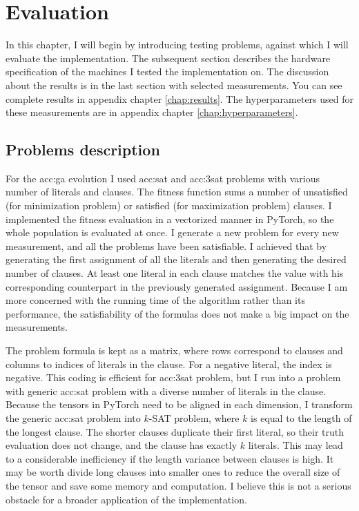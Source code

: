 \chapter{Evaluation}

In this chapter, I will begin by introducing testing problems, against which I will evaluate the implementation. The subsequent section describes the hardware specification of the machines I tested the implementation on. The discussion about the results is in the last section with selected measurements. You can see complete results in appendix chapter \ref{chap:results}. The hyperparameters used for these measurements are in appendix chapter \ref{chap:hyperparameters}.




\section{Problems description}

For the \acrlong{acc:ga} evolution I used \acrshort{acc:sat} and \acrshort{acc:3sat} problems with various number of literals and clauses. The fitness function sums a number of unsatisfied (for minimization problem) or satisfied (for maximization problem) clauses. I implemented the fitness evaluation in a vectorized manner in PyTorch, so the whole population is evaluated at once. I generate a new problem for every new measurement, and all the problems have been satisfiable. I achieved that by generating the first assignment of all the literals and then generating the desired number of clauses. At least one literal in each clause matches the value with his corresponding counterpart in the previously generated assignment. Because I am more concerned with the running time of the algorithm rather than its performance, the satisfiability of the formulas does not make a big impact on the measurements.

The problem formula is kept as a matrix, where rows correspond to clauses and columns to indices of literals in the clause. For a negative literal, the index is negative. This coding is efficient for \acrshort{acc:3sat} problem, but I run into a problem with generic \acrshort{acc:sat} problem with a diverse number of literals in the clause. Because the tensors in PyTorch need to be aligned in each dimension, I transform the generic \acrshort{acc:sat} problem into $k$-SAT problem, where $k$ is equal to the length of the longest clause. The shorter clauses duplicate their first literal, so their truth evaluation does not change, and the clause has exactly $k$ literals. This may lead to a considerable inefficiency if the length variance between clauses is high. It may be worth divide long clauses into smaller ones to reduce the overall size of the tensor and save some memory and computation. I believe this is not a serious obstacle for a broader application of the implementation.

